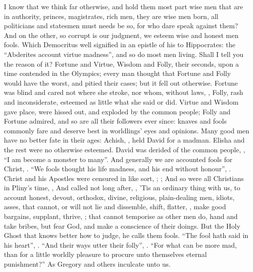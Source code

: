 I know that we think far otherwise, and hold them most part wise men that are
in authority, princes, magistrates, rich men, they are wise
men born, all politicians and statesmen must needs be so, for who dare speak
against them? And on the other, so corrupt is our judgment, we esteem wise and
honest men fools. Which Democritus well signified in an epistle of his to
Hippocrates: the \enquote{Abderites account virtue madness}, and so
do most men living. Shall I tell you the reason of it?
Fortune and Virtue, Wisdom and Folly, their seconds, upon a
time contended in the Olympics; every man thought that Fortune and Folly would
have the worst, and pitied their cases; but it fell out otherwise. Fortune was
blind and cared not where she stroke, nor whom, without laws, , \etc{} Folly, rash and inconsiderate, esteemed as little what she said
or did. Virtue and Wisdom gave place, were hissed out, and
exploded by the common people; Folly and Fortune admired, and so are all their
followers ever since: knaves and fools commonly fare and deserve best in
worldlings' eyes and opinions. Many good men have no better fate in their ages:
Achish, , held David for a madman.
Elisha and the rest were no otherwise esteemed. David was
derided of the common people, , \enquote{I am become a monster
to many}. And generally we are accounted fools for Christ, . \enquote{We fools thought his life madness, and his end without honour},
. Christ and his Apostles were censured in like sort,
; ;  And
so were all Christians in Pliny's time, , \etc{} And called not long after,
, \etc{}
'Tis an ordinary thing with us, to account honest, devout, orthodox, divine,
religious, plain-dealing men, idiots, asses, that cannot, or will not lie and
dissemble, shift, flatter, , make
good bargains, supplant, thrive, ; that cannot temporise as other men do, hand and
take bribes, \etc{} but fear God, and make a conscience of their doings. But
the Holy Ghost that knows better how to judge, he calls them fools. \enquote{The fool
hath said in his heart}, . \enquote{And their ways utter
their folly}, . \enquote{For what can
be more mad, than for a little worldly pleasure to procure unto themselves
eternal punishment?} As Gregory and others inculcate unto us.

